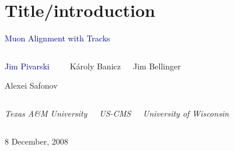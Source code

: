 \documentclass[compress]{beamer}
\begin{document}
\section*{Title/introduction}

\begin{frame}
\vfill
\begin{center}
\textcolor{darkblue}{\Large Muon Alignment with Tracks}

\vfill
\begin{columns}
\begin{center}
\large
\textcolor{darkblue}{Jim Pivarski}

\vspace{0.2 cm}
Alexei Safonov
\end{center}

\begin{center}
\large
K\'aroly Banicz
\end{center}

\begin{center}
\large
Jim Bellinger
\end{center}
\end{columns}

\begin{columns}
\begin{center}
\scriptsize
{\it Texas A\&M University}
\end{center}

\begin{center}
\scriptsize
{\it US-CMS}
\end{center}

\begin{center}
\scriptsize
{\it University of Wisconsin}
\end{center}
\end{columns}

\vfill
 8 December, 2008

\end{center}
\end{frame}

\end{document}
